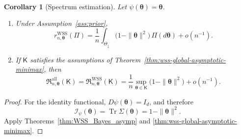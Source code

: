 \documentclass{article}
\newtheorem{corollary}[theorem]{Corollary}
\theoremstyle{named}
\theoremstyle{named1}
\newcommand{\Tr}{\operatorname{Tr}}
\newcommand{\WSS}{\mathrm{WSS}}
\newcommand{\btheta}{\boldsymbol{\theta}}
\newcommand{\cI}{\mathcal{I}}
\theoremstyle{plain}
\theoremstyle{remark}
\begin{document}
\begin{corollary}[Spectrum estimation]
\label{cor:wss-minimax-spectrum}
Let \(\psi(\btheta)=\btheta\).
\begin{enumerate}[label=\textup{(\roman*)}]
\item Under Assumption~\ref{ass:prior},
\[
    r_{n,\btheta}^{\WSS}(\Pi)
    =\frac1n
      \int_{\Theta_{\downarrow}}
      \bigl(1-\|\btheta\|^2\bigr)\,\Pi(d\btheta)
      +o(n^{-1}).
\]
\item If \(\mathsf K\) satisfies the assumptions of
Theorem~\ref{thm:wss-global-asymptotic-minimax}, then
\[
    \mathfrak R_{n,\btheta}^{\mathrm{all}}(\mathsf K)
    =\mathfrak R_{n,\btheta}^{\WSS}(\mathsf K)
    =\frac1n\sup_{\btheta\in\mathsf K}
      \bigl(1-\|\btheta\|^2\bigr)+o(n^{-1}).
\]
\end{enumerate}
\end{corollary}

\begin{proof}
For the identity functional, \(D\psi(\btheta)=I_d\), and therefore
\[
    \cI_\psi(\btheta)
    =\Tr\Sigma(\btheta)
    =1-\|\btheta\|^2.
\]
Apply Theorems~\ref{thm:WSS_Bayes_asymp} and
\ref{thm:wss-global-asymptotic-minimax}.
\end{proof}
\end{document}
